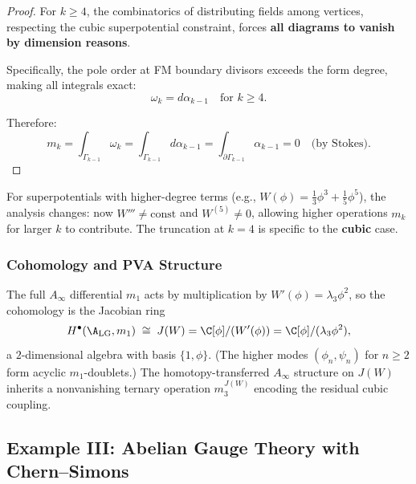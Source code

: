 \begin{proof}
For $k \geq 4$, the combinatorics of distributing fields among vertices, respecting the cubic superpotential constraint, forces \textbf{all diagrams to vanish by dimension reasons}.

Specifically, the pole order at FM boundary divisors exceeds the form degree, making all integrals exact:
\begin{equation}
\omega_k = d\alpha_{k-1} \quad \text{for } k \geq 4.
\end{equation}

Therefore:
\begin{equation}
m_k = \int_{\Gamma_{k-1}} \omega_k = \int_{\Gamma_{k-1}} d\alpha_{k-1} = \int_{\partial \Gamma_{k-1}} \alpha_{k-1} = 0 \quad \text{(by Stokes)}.
\end{equation}
\end{proof}

\begin{remark}
For superpotentials with higher-degree terms (e.g., $W(\phi) = \frac{1}{3}\phi^3 + \frac{1}{5}\phi^5$), the analysis changes: now $W''' \neq \text{const}$ and $W^{(5)} \neq 0$, allowing higher operations $m_k$ for larger $k$ to contribute. The truncation at $k=4$ is specific to the \textbf{cubic} case.
\end{remark}

\subsubsection{Cohomology and PVA Structure}

\begin{proposition}
The full $A_\infty$ differential $m_1$ acts by multiplication by $W'(\phi) = \lambda_3 \phi^2$, so
the cohomology is the Jacobian ring
\begin{equation}
H^\bullet(\A_{\text{LG}}, m_1) \;\cong\; J(W) = \C[\phi]/(W'(\phi)) = \C[\phi]/(\lambda_3 \phi^2),
\end{equation}
a $2$-dimensional algebra with basis $\{1, \phi\}$.
(The higher modes $(\phi_n, \psi_n)$ for $n \geq 2$ form acyclic $m_1$-doublets.)
The homotopy-transferred $A_\infty$ structure on $J(W)$ inherits a nonvanishing ternary
operation $m_3^{J(W)}$ encoding the residual cubic coupling.
\end{proposition}

\subsection{Example III: Abelian Gauge Theory with Chern--Simons}

